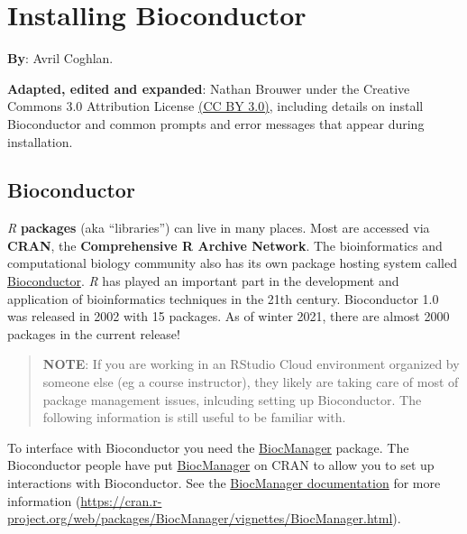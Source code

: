 \documentclass[
]{book}
\begin{document}
\hypertarget{installing-bioconductor}{%
\chapter{Installing Bioconductor}\label{installing-bioconductor}}

\textbf{By}: Avril Coghlan.

\textbf{Adapted, edited and expanded}: Nathan Brouwer under the Creative Commons 3.0 Attribution License \href{https://creativecommons.org/licenses/by/3.0/}{(CC BY 3.0)}, including details on install Bioconductor and common prompts and error messages that appear during installation.

\hypertarget{bioconductor}{%
\section{Bioconductor}\label{bioconductor}}

\emph{R} \textbf{packages} (aka ``libraries'') can live in many places. Most are accessed via \textbf{CRAN}, the \textbf{Comprehensive R Archive Network}. The bioinformatics and computational biology community also has its own package hosting system called \href{www.bioconductor.org}{Bioconductor}. \emph{R} has played an important part in the development and application of bioinformatics techniques in the 21th century. Bioconductor 1.0 was released in 2002 with 15 packages. As of winter 2021, there are almost 2000 packages in the current release!

\begin{quote}
\textbf{NOTE}: If you are working in an RStudio Cloud environment organized by someone else (eg a course instructor), they likely are taking care of most of package management issues, inlcuding setting up Bioconductor. The following information is still useful to be familiar with.
\end{quote}

To interface with Bioconductor you need the \href{https://cran.r-project.org/web/packages/BiocManager/vignettes/BiocManager.html}{BiocManager} package. The Bioconductor people have put \href{https://cran.r-project.org/web/packages/BiocManager/vignettes/BiocManager.html}{BiocManager} on CRAN to allow you to set up interactions with Bioconductor. See the \href{https://cran.r-project.org/web/packages/BiocManager/vignettes/BiocManager.html}{BiocManager documentation} for more information (\url{https://cran.r-project.org/web/packages/BiocManager/vignettes/BiocManager.html}).
\end{document}
